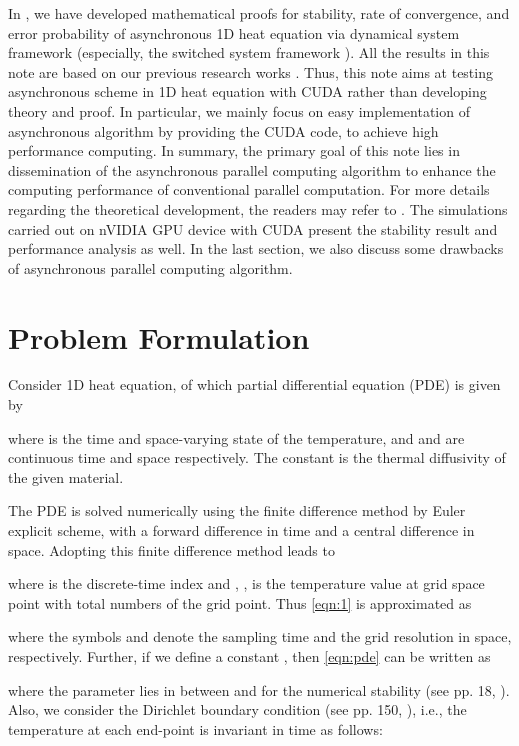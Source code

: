 \documentclass[1p]{elsarticle}
\begin{document}
In \citep{lee2015async}, we have developed mathematical proofs for stability, rate of convergence, and error probability of asynchronous 1D heat equation via dynamical system framework (especially, the switched system framework \citep{lee2015stability, lee2015performance}). All the results in this note are based on our previous research works \citep{lee2015async}.
Thus, this note aims at testing asynchronous scheme in 1D heat equation with \textsf{CUDA} rather than developing theory and proof. In particular, we mainly focus on easy implementation of asynchronous algorithm by providing the \textsf{CUDA} code, to achieve high performance computing. In summary, the primary goal of this note lies in dissemination of the asynchronous parallel computing algorithm to enhance the computing performance of conventional parallel computation. For more details regarding the theoretical development, the readers may refer to \citep{lee2015async}. The simulations carried out on \textsf{nVIDIA GPU} device with \textsf{CUDA} present the stability result and performance analysis as well. In the last section, we also discuss some drawbacks of asynchronous parallel computing algorithm.

\section{Problem Formulation}


Consider 1D heat equation, of which partial differential equation (PDE) is given by

where  is the time and space-varying state of the temperature, and  and  are continuous time and space respectively. The constant  is the thermal diffusivity of the given material. 

The PDE is solved numerically using the finite difference method by Euler explicit scheme, with a forward difference in time and a central difference in space. Adopting this finite difference method leads to

where  is the discrete-time index and , , is the temperature value at  grid space point with total  numbers of the grid point. Thus \eqref{eqn:1} is approximated as 

where the symbols  and  denote the sampling time and the grid resolution in space, respectively. Further, if we define a constant , then \eqref{eqn:pde} can be written as 

where the parameter  lies in between  and  for the numerical stability (see pp. 18, \citep{smith1985numerical}). 
Also, we consider the Dirichlet boundary condition (see pp. 150, \citep{pletcher2012computational}), i.e., the temperature at each end-point is invariant in time as follows:
\end{document}
